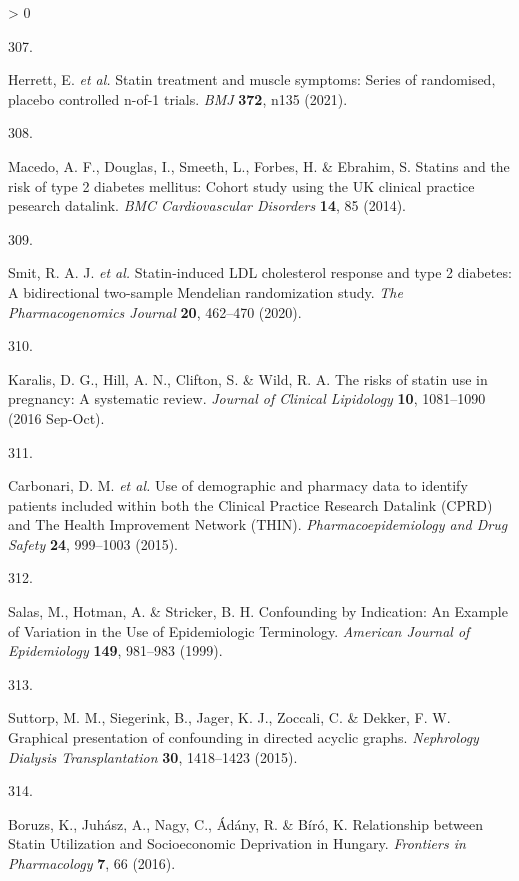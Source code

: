 \documentclass[a4paper, twoside]{templates/ociamthesis}
\newlength{\cslhangindent}
\newlength{\csllabelwidth}
\newenvironment{CSLReferences}[3] %
 {%
  \setlength{\parindent}{0pt}
  \ifodd #1 \everypar{\setlength{\hangindent}{\cslhangindent}}\ignorespaces\fi
  \ifnum #2 > 0
  \setlength{\parskip}{#2\baselineskip}
  \fi
 }%
 {}
\newcommand{\CSLLeftMargin}[1]{\parbox[t]{\maxof{\widthof{#1}}{\csllabelwidth}}{#1}}
\newcommand{\CSLRightInline}[1]{\parbox[t]{\linewidth - \csllabelwidth}{#1}}
\begin{document}
\begin{CSLReferences}{0}{0}
\leavevmode\hypertarget{ref-herrett2021}{}%
\CSLLeftMargin{307. }
\CSLRightInline{Herrett, E. \emph{et al.} Statin treatment and muscle symptoms: Series of randomised, placebo controlled n-of-1 trials. \emph{BMJ} \textbf{372}, n135 (2021).}

\leavevmode\hypertarget{ref-macedo2014}{}%
\CSLLeftMargin{308. }
\CSLRightInline{Macedo, A. F., Douglas, I., Smeeth, L., Forbes, H. \& Ebrahim, S. Statins and the risk of type 2 diabetes mellitus: Cohort study using the {UK} clinical practice pesearch datalink. \emph{BMC Cardiovascular Disorders} \textbf{14}, 85 (2014).}

\leavevmode\hypertarget{ref-smit2020}{}%
\CSLLeftMargin{309. }
\CSLRightInline{Smit, R. A. J. \emph{et al.} Statin-induced {LDL} cholesterol response and type 2 diabetes: A bidirectional two-sample {Mendelian} randomization study. \emph{The Pharmacogenomics Journal} \textbf{20}, 462--470 (2020).}

\leavevmode\hypertarget{ref-karalis2016}{}%
\CSLLeftMargin{310. }
\CSLRightInline{Karalis, D. G., Hill, A. N., Clifton, S. \& Wild, R. A. The risks of statin use in pregnancy: A systematic review. \emph{Journal of Clinical Lipidology} \textbf{10}, 1081--1090 (2016 Sep-Oct).}

\leavevmode\hypertarget{ref-carbonari2015}{}%
\CSLLeftMargin{311. }
\CSLRightInline{Carbonari, D. M. \emph{et al.} Use of demographic and pharmacy data to identify patients included within both the {Clinical Practice Research Datalink} ({CPRD}) and {The Health Improvement Network} ({THIN}). \emph{Pharmacoepidemiology and Drug Safety} \textbf{24}, 999--1003 (2015).}

\leavevmode\hypertarget{ref-salas1999}{}%
\CSLLeftMargin{312. }
\CSLRightInline{Salas, M., Hotman, A. \& Stricker, B. H. Confounding by {Indication}: An {Example} of {Variation} in the {Use} of {Epidemiologic Terminology}. \emph{American Journal of Epidemiology} \textbf{149}, 981--983 (1999).}

\leavevmode\hypertarget{ref-suttorp2015}{}%
\CSLLeftMargin{313. }
\CSLRightInline{Suttorp, M. M., Siegerink, B., Jager, K. J., Zoccali, C. \& Dekker, F. W. Graphical presentation of confounding in directed acyclic graphs. \emph{Nephrology Dialysis Transplantation} \textbf{30}, 1418--1423 (2015).}

\leavevmode\hypertarget{ref-boruzs2016}{}%
\CSLLeftMargin{314. }
\CSLRightInline{Boruzs, K., Juhász, A., Nagy, C., Ádány, R. \& Bíró, K. Relationship between {Statin Utilization} and {Socioeconomic Deprivation} in {Hungary}. \emph{Frontiers in Pharmacology} \textbf{7}, 66 (2016).}


\end{CSLReferences}
\end{document}
